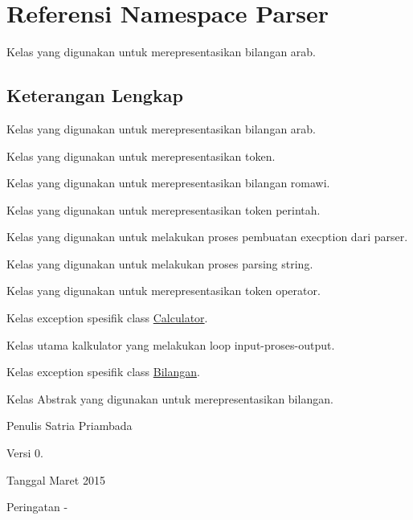 \hypertarget{namespaceParser}{}\section{Referensi Namespace Parser}
\label{namespaceParser}


Kelas yang digunakan untuk merepresentasikan bilangan arab.  




\subsection{Keterangan Lengkap}
Kelas yang digunakan untuk merepresentasikan bilangan arab. 

Kelas yang digunakan untuk merepresentasikan token.

Kelas yang digunakan untuk merepresentasikan bilangan romawi.

Kelas yang digunakan untuk merepresentasikan token perintah.

Kelas yang digunakan untuk melakukan proses pembuatan execption dari parser.

Kelas yang digunakan untuk melakukan proses parsing string.

Kelas yang digunakan untuk merepresentasikan token operator.

Kelas exception spesifik class \hyperlink{classCalculator}{Calculator}.

Kelas utama kalkulator yang melakukan loop input-\/proses-\/output.

Kelas exception spesifik class \hyperlink{classBilangan}{Bilangan}.

Kelas Abstrak yang digunakan untuk merepresentasikan bilangan.

\begin{DoxyAuthor}{Penulis}
Satria Priambada 
\end{DoxyAuthor}
\begin{DoxyVersion}{Versi}
0. 
\end{DoxyVersion}
\begin{DoxyDate}{Tanggal}
Maret 2015 
\end{DoxyDate}
\begin{DoxyWarning}{Peringatan}
-\/ 
\end{DoxyWarning}
